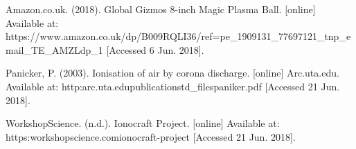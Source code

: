 \documentclass[11pt]{article}
\begin{document}
\begin{thebibliography}{9}
Amazon.co.uk. (2018). Global Gizmos 8-inch Magic Plasma Ball. [online] Available at: https://www.amazon.co.uk/dp/B009RQLI36/ref=pe\_1909131\_77697121\_tnp\_email\_TE\_AMZLdp\_1 [Accessed 6 Jun. 2018].

Panicker, P. (2003). Ionisation of air by corona discharge. [online] Arc.uta.edu. Available at: http:\/\/arc.uta.edu\/publications\/td\_files\/paniker.pdf [Accessed 21 Jun. 2018].

WorkshopScience. (n.d.). Ionocraft Project. [online] Available at: https:\/\/workshopscience.com\/ionocraft-project\/ [Accessed 21 Jun. 2018].

\end{thebibliography}
\end{document}
